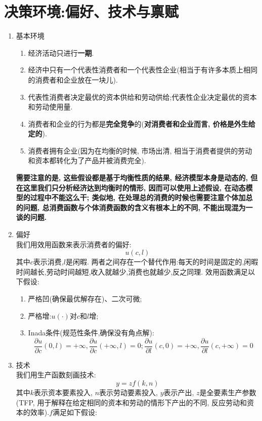 \documentclass[lang=cn,10pt]{elegantbook}
\begin{document}
\section{决策环境:偏好、技术与禀赋}
\begin{enumerate}
    \item 基本环境
    \begin{enumerate}
        \item 经济活动只进行\textbf{一期}.
        \item 经济中只有一个代表性消费者和一个代表性企业(相当于有许多本质上相同的消费者和企业放在一块儿).
        \item 代表性消费者决定最优的资本供给和劳动供给;代表性企业决定最优的资本和劳动使用量.
        \item 消费者和企业的行为都是\textbf{完全竞争}的(\textbf{对消费者和企业而言, 价格是外生给定的}).
        \item 消费者拥有企业(因为在均衡的时候, 市场出清, 相当于消费者提供的劳动和资本都转化为了产品并被消费完全).
    \end{enumerate}
    \textbf{需要注意的是, 这些假设都是基于均衡性质的结果, 经济模型本身是动态的, 但在这里我们只分析经济达到均衡时的情形, 因而可以使用上述假设, 在动态模型的过程中不能这么干;
    类似地, 在处理总的消费的时候也需要注意个体加总的问题, 总消费函数与个体消费函数的含义有根本上的不同, 不能出现混为一谈的问题.}
    \item 偏好\\
    我们用效用函数来表示消费者的偏好:
    $$u(c,l)$$
    其中$c$表示消费,$l$是闲暇. 两者之间存在一个替代作用:每天的时间是固定的,闲暇时间越长,劳动时间越短,收入就越少,消费也就越少,反之同理.
    效用函数满足以下假设:
    \begin{enumerate}
        \item 严格凹(确保最优解存在)、二次可微;
        \item 严格增:$u(\cdot)$对$c$和$l$增;
        \item Inada条件(规范性条件,确保没有角点解):$$\frac{\partial u}{\partial c}(0,l)=+\infty,\frac{\partial u}{\partial c}(+\infty,l)=0;\frac{\partial u}{\partial l}(c,0)=+\infty,\frac{\partial u}{\partial l}(c,+\infty)=0$$
     \end{enumerate}
    \item 技术\\
    我们用生产函数刻画技术:
    $$y=zf(k,n)$$
    其中$k$表示资本要素投入, $n$表示劳动要素投入, $y$表示产出, $z$是全要素生产参数(TFP, 用于解释在给定相同的资本和劳动的情形下产出的不同, 反应劳动和资本的效率).$f$满足如下假设:
    \begin{enumerate}

\end{enumerate}
\end{enumerate}
\end{document}
